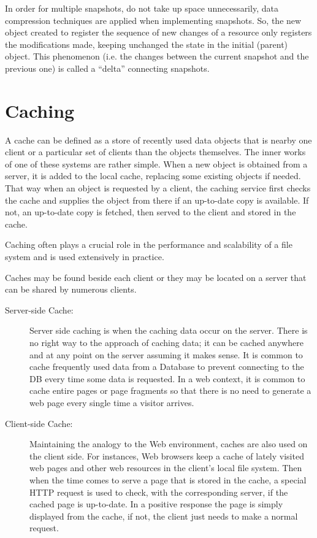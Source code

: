 In order for multiple snapshots, do not take up space unnecessarily, data compression techniques are applied when implementing snapshots. So, the new object created to register the sequence of new changes of a resource only registers the modifications made, keeping unchanged the state in the initial (parent) object. This phenomenon (i.e. the changes between the current snapshot and the previous one) is called a ``delta'' connecting snapshots.



\section{Caching} %
\label{sec:res_caching}


A cache can be defined as a store of recently used data objects that is nearby one client or a particular set of clients than the objects themselves. The inner works of one of these systems are rather simple. When a new object is obtained from a server, it is added to the local cache, replacing some existing objects if needed. That way when an object is requested by a client, the caching service first checks the cache and supplies the object from there if an up-to-date copy is available. If not, an up-to-date copy is fetched, then served to the client and stored in the cache. 

Caching often plays a crucial role in the performance and scalability of a file system and is used extensively in practice.

Caches may be found beside each client or they may be located on a server that can be shared by numerous clients.

\begin{description}
	\item [Server-side Cache:] Server side caching is when the caching data occur on the server. There is no right way to the approach of caching data; it can be cached anywhere and at any point on the server assuming it makes sense. It is common to cache frequently used data from a Database to prevent connecting to the DB every time some data is requested. In a web context, it is common to cache entire pages or page fragments so that there is no need to generate a web page every single time a visitor arrives.
	\item [Client-side Cache:] Maintaining the analogy to the Web environment, caches are also used on the client side. For instances, Web browsers keep a cache of lately visited web pages and other web resources in the client’s local file system. Then when the time comes to serve a page that is stored in the cache, a special HTTP request is used to check, with the corresponding server, if the cached page is up-to-date. In a positive response the page is simply displayed from the cache, if not, the client just needs to make a normal request.
\end{description}



